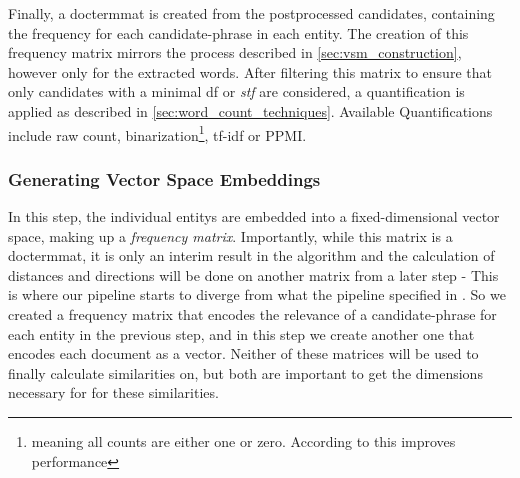 
Finally, a \gls{doctermmat} is created from the postprocessed candidates, containing the frequency for each candidate-phrase in each entity. The creation of this frequency matrix mirrors the process described in \autoref{sec:vsm_construction}, however only for the extracted words. After filtering this matrix to ensure that only candidates with a minimal \gls{df} or \textit{stf} are considered, a quantification is applied as described in \autoref{sec:word_count_techniques}. Available Quantifications include raw count, binarization\footnote{meaning all counts are either one or zero. According to \cite{Alshaikh2020} this improves performance }, tf-idf or PPMI.

\cite{Derrac2015} 



\subsubsection{Generating Vector Space Embeddings}
\label{sec:generate_vectorspaces}


In this step, the individual \glspl{entity} are embedded into a fixed-dimensional vector space, making up a \emph{frequency matrix}. Importantly, while this matrix is a \gls{doctermmat}, it is only an interim result in the algorithm and the calculation of distances and directions will be done on another matrix from a later step - This is where our pipeline starts to diverge from what the pipeline specified in . So we created a frequency matrix that encodes the relevance of a candidate-phrase for each entity in the previous step, and in this step we create another one that encodes each document as a vector. Neither of these matrices will be used to finally calculate similarities on, but both are important to get the dimensions necessary for for these similarities.

